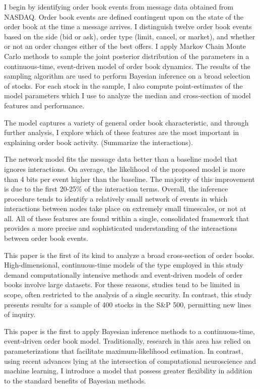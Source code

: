 I begin by identifying order book events from message data obtained from NASDAQ. Order book events are defined contingent upon on the state of the order book at the time a message arrives. I distinguish twelve order book events based on the side (bid or ask), order type (limit, cancel, or market), and whether or not an order changes either of the best offers. I apply Markov Chain Monte Carlo methods to sample the joint posterior distribution of the parameters in a continuous-time, event-driven model of order book dynamics. The results of the sampling algorithm are used to perform Bayesian inference on a broad selection of stocks. For each stock in the sample, I also compute point-estimates of the model parameters which I use to analyze the median and cross-section of model features and performance.

The model captures a variety of general order book characteristic, and through further analysis, I explore which of these features are the most important in explaining order book activity. (Summarize the interactions).

The network model fits the message data better than a baseline model that ignores interactions. On average, the likelihood of the proposed model is more than 4 bits per event higher than the baseline. The majority of this improvement is due to the first 20-25\% of the interaction terms. Overall, the inference procedure tends to identify a relatively small network of events in which interactions between nodes take place on extremely small timescales, or not at all. All of these features are found within a single, consolidated framework that provides a more precise and sophisticated understanding of the interactions between order book events.

This paper is the first of its kind to analyze a broad cross-section of order books. High-dimensional, continuous-time models of the type employed in this study demand computationally intensive methods and event-driven models of order books involve large datasets. For these reasons, studies tend to be limited in scope, often restricted to the analysis of a single security. In contrast, this study presents results for a sample of 400 stocks in the S\&P 500, permitting new lines of inquiry.

This paper is the first to apply Bayesian inference methods to a continuous-time, event-driven order book model. Traditionally, research in this area has relied on parameterizations that facilitate maximum-likelihood estimation. In contrast, using recent advances lying at the intersection of computational neuroscience and machine learning, I introduce a model that possess greater flexibility in addition to the standard benefits of Bayesian methods.

